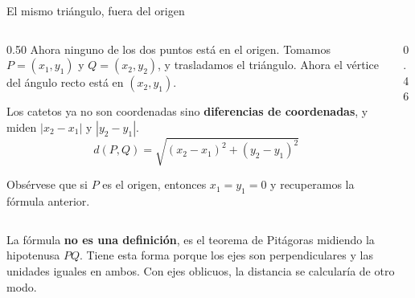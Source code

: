 \documentclass[aspectratio=169,10pt]{beamer}
\newcommand{\destaca}[1]{%
  \par\vspace{3pt}\noindent
  \colorbox{turquesaClaro}{%
    \parbox{\dimexpr\linewidth-2\fboxsep\relax}{\vspace{3pt}#1\vspace{3pt}}}%
  \par\vspace{3pt}}
\begin{document}
\begin{frame}{El mismo triángulo, fuera del origen}
  \begin{columns}[T]
    \begin{column}{0.50\textwidth}
      Ahora ninguno de los dos puntos está en el origen. Tomamos
      $P=(x_1,y_1)$ y $Q=(x_2,y_2)$, y trasladamos el triángulo. Ahora el vértice del ángulo recto está en $(x_2,y_1)$.

      \vspace{0.15cm}
      Los catetos ya no son coordenadas sino \textbf{diferencias de
      coordenadas}, y miden $|x_2-x_1|$ y $|y_2-y_1|$.
      \[
        d(P,Q)=\sqrt{(x_2-x_1)^2+(y_2-y_1)^2}
      \]

      \vspace{0.05cm}
      Obsérvese que si $P$ es el origen, entonces $x_1=y_1=0$ y recuperamos la
      fórmula anterior.
    \end{column}
    \begin{column}{0.46\textwidth}
      \begin{center}
      \end{center}
    \end{column}
  \end{columns}

  \vspace{0.15cm}
  \destaca{\small La fórmula \textbf{no es una definición}, es el
  teorema de Pitágoras midiendo la hipotenusa $PQ$. Tiene esta forma
  porque los ejes son perpendiculares y las unidades iguales en ambos.
  Con ejes oblicuos, la distancia se calcularía de otro modo.}
\end{frame}
\end{document}
